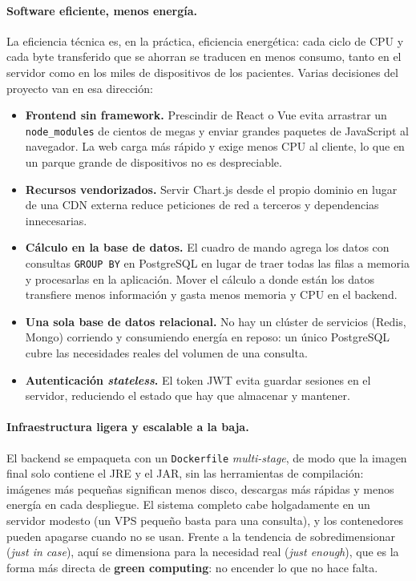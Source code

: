 \documentclass[12pt,a4paper]{report}
\begin{document}
\paragraph{Software eficiente, menos energía.} La eficiencia técnica es, en la práctica, eficiencia energética: cada ciclo de CPU y cada byte transferido que se ahorran se traducen en menos consumo, tanto en el servidor como en los miles de dispositivos de los pacientes. Varias decisiones del proyecto van en esa dirección:
\begin{itemize}
  \item \textbf{Frontend sin framework.} Prescindir de React o Vue evita arrastrar un \texttt{node\_modules} de cientos de megas y enviar grandes paquetes de JavaScript al navegador. La web carga más rápido y exige menos CPU al cliente, lo que en un parque grande de dispositivos no es despreciable.
  \item \textbf{Recursos vendorizados.} Servir Chart.js desde el propio dominio en lugar de una CDN externa reduce peticiones de red a terceros y dependencias innecesarias.
  \item \textbf{Cálculo en la base de datos.} El cuadro de mando agrega los datos con consultas \texttt{GROUP BY} en PostgreSQL en lugar de traer todas las filas a memoria y procesarlas en la aplicación. Mover el cálculo a donde están los datos transfiere menos información y gasta menos memoria y CPU en el backend.
  \item \textbf{Una sola base de datos relacional.} No hay un clúster de servicios (Redis, Mongo) corriendo y consumiendo energía en reposo: un único PostgreSQL cubre las necesidades reales del volumen de una consulta.
  \item \textbf{Autenticación \emph{stateless}.} El token JWT evita guardar sesiones en el servidor, reduciendo el estado que hay que almacenar y mantener.
\end{itemize}

\paragraph{Infraestructura ligera y escalable a la baja.} El backend se empaqueta con un \texttt{Dockerfile} \emph{multi-stage}, de modo que la imagen final solo contiene el JRE y el JAR, sin las herramientas de compilación: imágenes más pequeñas significan menos disco, descargas más rápidas y menos energía en cada despliegue. El sistema completo cabe holgadamente en un servidor modesto (un VPS pequeño basta para una consulta), y los contenedores pueden apagarse cuando no se usan. Frente a la tendencia de sobredimensionar (\emph{just in case}), aquí se dimensiona para la necesidad real (\emph{just enough}), que es la forma más directa de \textbf{green computing}: no encender lo que no hace falta.
\end{document}
